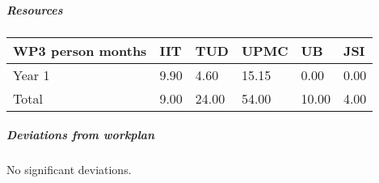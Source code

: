 
\subparagraph{Resources}

\begin{center}
\begin{tabular}{|C{1.5cm}|C{1.5cm}|C{1.5cm}|C{2cm}|C{2cm}|C{2cm}|}
\hline
\footnotesize \textbf{WP3 person months}& \footnotesize \textbf{IIT}&\footnotesize \textbf{TUD}&\footnotesize \textbf{UPMC}& \footnotesize \textbf{UB} &\footnotesize \textbf{JSI}\\ \hline
\footnotesize Year 1 &  9.90 & 4.60 & 15.15 & 0.00 & 0.00      \\  \hline
\footnotesize Total &  9.00	 & 24.00 & 54.00 & 10.00 & 4.00 \\ \hline
\end{tabular}
\end{center}

\subparagraph{Deviations from workplan} 
No significant deviations. 

